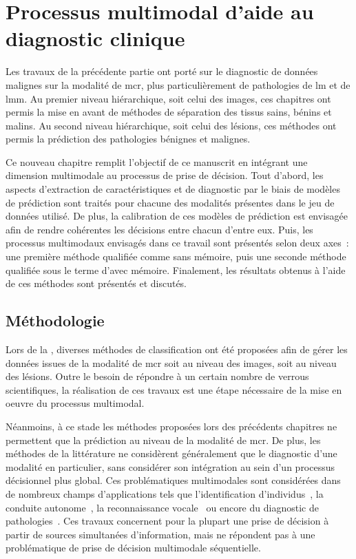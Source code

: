 \renewcommand{\thechapter}{\arabic{chapter}}
\setcounter{chapter}{7}

\chapter{Processus multimodal d'aide au diagnostic clinique}
\label{chap:chapter_8}
\chapterintro
Les travaux de la précédente partie ont porté sur le diagnostic de données malignes sur la modalité de \acrlong{mcr}, plus particulièrement de pathologies de \acrlong{lm} et de \acrlong{lmm}. Au premier niveau hiérarchique, soit celui des images, ces chapitres ont permis la mise en avant de méthodes de séparation des tissus sains, bénins et malins. Au second niveau hiérarchique, soit celui des lésions, ces méthodes ont permis la prédiction des pathologies bénignes et malignes.\par

Ce nouveau chapitre remplit l'objectif de ce manuscrit en intégrant une dimension multimodale au processus de prise de décision. Tout d'abord, les aspects d'extraction de caractéristiques et de diagnostic par le biais de modèles de prédiction sont traités pour chacune des modalités présentes dans le jeu de données utilisé. De plus, la calibration de ces modèles de prédiction est envisagée afin de rendre cohérentes les décisions entre chacun d’entre eux. Puis, les processus multimodaux envisagés dans ce travail sont présentés selon deux axes~: une première méthode qualifiée comme sans mémoire, puis une seconde méthode qualifiée sous le terme d’avec mémoire. Finalement, les résultats obtenus à l'aide de ces méthodes sont présentés et discutés.\par
\newpage

\section{Méthodologie}
Lors de la , diverses méthodes de classification ont été proposées afin de gérer les données issues de la modalité de \gls{mcr} soit au niveau des images, soit au niveau des lésions. Outre le besoin de répondre à un certain nombre de verrous scientifiques, la réalisation de ces travaux est une étape nécessaire de la mise en oeuvre du processus multimodal.\par

Néanmoins, à ce stade les méthodes proposées lors des précédents chapitres ne permettent que la prédiction au niveau de la modalité de \gls{mcr}. De plus, les méthodes de la littérature ne considèrent généralement que le diagnostic d'une modalité en particulier, sans considérer son intégration au sein d'un processus décisionnel plus global. Ces problématiques multimodales sont considérées dans de nombreux champs d'applications tels que l'identification d'individus~\cite{Lupu2008}, la conduite autonome~\cite{Xiao2019}, la reconnaissance vocale~\cite{Ngiam2011} ou encore du diagnostic de pathologies~\cite{Lim2014, Liu2015a}. Ces travaux concernent pour la plupart une prise de décision à partir de sources simultanées d'information, mais ne répondent pas à une problématique de prise de décision multimodale séquentielle.\par

